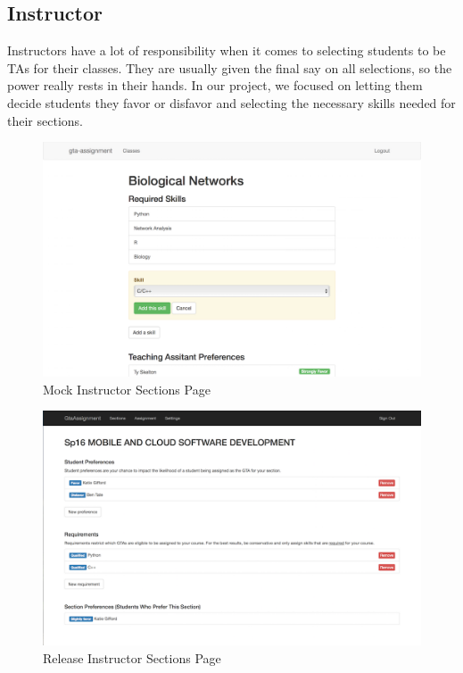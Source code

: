 \subsection{Instructor}

Instructors have a lot of responsibility when it comes to selecting students to be TAs for their classes.
They are usually given the final say on all selections, so the power really rests in their hands.
In our project, we focused on letting them decide students they favor or disfavor and selecting the necessary skills needed for their sections.

\begin{figure}[!htb]
  \centering
  \includegraphics[width=0.75\linewidth]{images/instructor-section-design.png}
  \caption{Mock Instructor Sections Page}\label{instructor-section-design}
\end{figure}

\begin{figure}[!htb]
  \centering
  \includegraphics[width=0.75\linewidth]{images/instructor-section-beta.png}
  \caption{Release Instructor Sections Page}\label{instructor-section-beta}
\end{figure}


